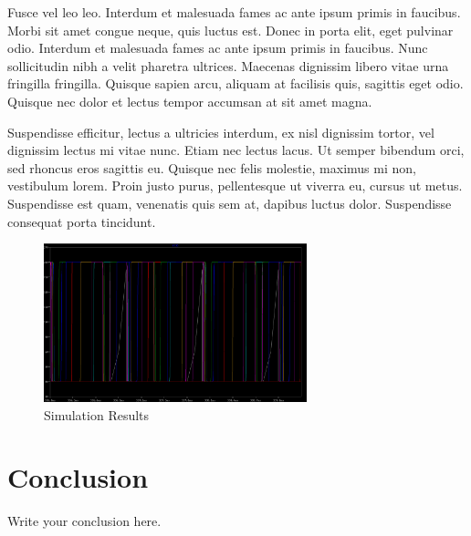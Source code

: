\documentclass{article}
\begin{document}
        Fusce vel leo leo. Interdum et malesuada fames ac ante ipsum primis in faucibus. Morbi sit amet congue neque, quis luctus est. Donec in porta elit, eget pulvinar odio. Interdum et malesuada fames ac ante ipsum primis in faucibus. Nunc sollicitudin nibh a velit pharetra ultrices. Maecenas dignissim libero vitae urna fringilla fringilla. Quisque sapien arcu, aliquam at facilisis quis, sagittis eget odio. Quisque nec dolor et lectus tempor accumsan at sit amet magna.

        Suspendisse efficitur, lectus a ultricies interdum, ex nisl dignissim tortor, vel dignissim lectus mi vitae nunc. Etiam nec lectus lacus. Ut semper bibendum orci, sed rhoncus eros sagittis eu. Quisque nec felis molestie, maximus mi non, vestibulum lorem. Proin justo purus, pellentesque ut viverra eu, cursus ut metus. Suspendisse est quam, venenatis quis sem at, dapibus luctus dolor. Suspendisse consequat porta tincidunt. 

\begin{figure}
    \centering
    \includegraphics[width=3.0in]{my-simulation.png}
    \caption{Simulation Results}
    \label{simulationfigure}
\end{figure}

\section{Conclusion}
Write your conclusion here.
\end{document}
